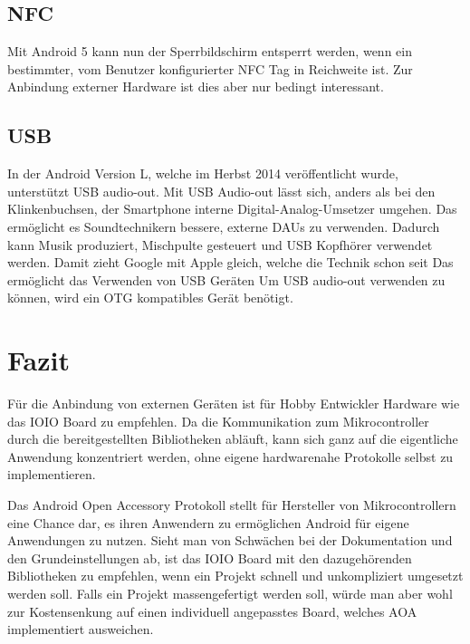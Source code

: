 \documentclass[12pt,journal,compsoc]{IEEEtran}
\begin{document}
\subsection{NFC}
Mit Android 5 kann nun der Sperrbildschirm entsperrt werden, wenn ein bestimmter, vom Benutzer konfigurierter NFC Tag in Reichweite ist. Zur Anbindung externer Hardware ist dies aber nur bedingt interessant.


\subsection{USB}
In der Android Version L, welche im Herbst 2014 veröffentlicht wurde, unterstützt USB audio-out. Mit USB Audio-out lässt sich, anders als bei den Klinkenbuchsen, der Smartphone interne Digital-Analog-Umsetzer umgehen. Das ermöglicht es Soundtechnikern bessere, externe DAUs zu verwenden.
Dadurch kann Musik produziert, Mischpulte gesteuert und USB Kopfhörer verwendet werden.
Damit zieht Google mit Apple gleich, welche die Technik schon seit 
Das ermöglicht das Verwenden von USB Geräten  
Um USB audio-out verwenden zu können, wird ein OTG kompatibles Gerät benötigt.

\section{Fazit}
Für die Anbindung von externen Geräten ist für Hobby Entwickler Hardware wie das IOIO Board zu empfehlen.
Da die Kommunikation zum Mikrocontroller durch die bereitgestellten Bibliotheken abläuft, kann sich ganz auf die eigentliche Anwendung konzentriert werden, ohne eigene hardwarenahe Protokolle selbst zu implementieren.

Das Android Open Accessory Protokoll stellt für Hersteller von Mikrocontrollern eine Chance dar, es ihren Anwendern zu ermöglichen Android für eigene Anwendungen zu nutzen.
Sieht man von Schwächen bei der Dokumentation und den Grundeinstellungen ab, ist das IOIO Board mit den dazugehörenden Bibliotheken zu empfehlen, wenn ein Projekt schnell und unkompliziert umgesetzt werden soll.
Falls ein Projekt massengefertigt werden soll, würde man aber wohl zur Kostensenkung auf einen individuell angepasstes Board, welches AOA implementiert ausweichen.







\nocite{*}
\end{document}
